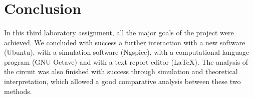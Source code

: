 \section{Conclusion}
\label{sec:conclusion}

\paragraph{}
In this third laboratory assignment, all the major goals of the project were achieved. We concluded with success a further interaction with a new software (Ubuntu), with a simulation software (Ngspice), with a computational language program (GNU Octave) and with a text report editor (LaTeX). The analysis of the circuit was also finished with success through simulation and theoretical interpretation, which allowed a good comparative analysis between these two methods.
